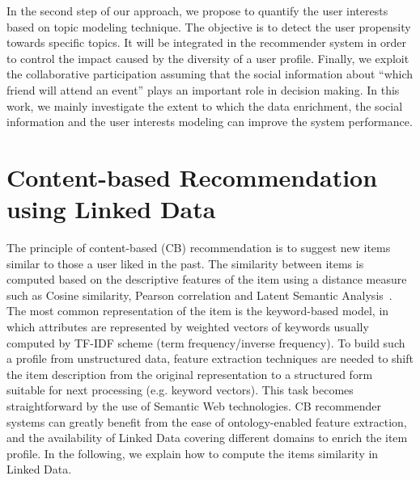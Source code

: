 In the second step of our approach, we propose to quantify the user interests based on topic modeling technique. The objective is to detect the user propensity towards specific topics. It will be integrated in the recommender system in order to control the impact caused by the diversity of a user profile. Finally, we exploit the collaborative participation assuming that the social information about ``which friend will attend an event'' plays an important role in decision making. In this work, we mainly investigate the extent to which the data enrichment, the social information and the user interests modeling can improve the system performance.


\section{Content-based Recommendation using Linked Data}
\label{sec:linkeddata-recommendation}
The principle of content-based (CB) recommendation is to suggest new items similar to those a user liked in the past. The similarity between items is computed based on the descriptive features of the item using a distance measure such as Cosine similarity, Pearson correlation and Latent Semantic Analysis~\cite{Landauer:1998}. The most common representation of the item is the keyword-based model, in which attributes are represented by weighted vectors of keywords usually computed by TF-IDF scheme (term frequency/inverse frequency). To build such a profile from unstructured data, feature extraction techniques are needed to shift the item description from the original representation to a structured form suitable for next processing (e.g. keyword vectors). This task becomes straightforward by the use of Semantic Web technologies. CB recommender systems can greatly benefit from the ease of ontology-enabled feature extraction, and the availability of Linked Data covering different domains to enrich the item profile. In the following, we explain how to compute the items similarity in Linked Data.

